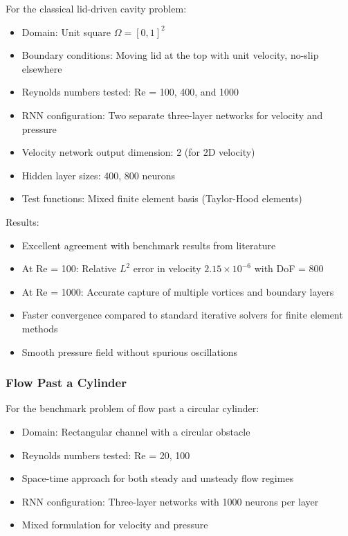 \documentclass[11pt,a4paper]{article}
\begin{document}
For the classical lid-driven cavity problem:

\begin{itemize}
    \item Domain: Unit square $\Omega = [0,1]^2$
    \item Boundary conditions: Moving lid at the top with unit velocity, no-slip elsewhere
    \item Reynolds numbers tested: Re = 100, 400, and 1000
    \item RNN configuration: Two separate three-layer networks for velocity and pressure
    \item Velocity network output dimension: 2 (for 2D velocity)
    \item Hidden layer sizes: 400, 800 neurons
    \item Test functions: Mixed finite element basis (Taylor-Hood elements)
\end{itemize}

Results:
\begin{itemize}
    \item Excellent agreement with benchmark results from literature
    \item At Re = 100: Relative $L^2$ error in velocity $2.15 \times 10^{-6}$ with DoF = 800
    \item At Re = 1000: Accurate capture of multiple vortices and boundary layers
    \item Faster convergence compared to standard iterative solvers for finite element methods
    \item Smooth pressure field without spurious oscillations
\end{itemize}

\subsubsection{Flow Past a Cylinder}

For the benchmark problem of flow past a circular cylinder:

\begin{itemize}
    \item Domain: Rectangular channel with a circular obstacle
    \item Reynolds numbers tested: Re = 20, 100
    \item Space-time approach for both steady and unsteady flow regimes
    \item RNN configuration: Three-layer networks with 1000 neurons per layer
    \item Mixed formulation for velocity and pressure
\end{itemize}
\end{document}
